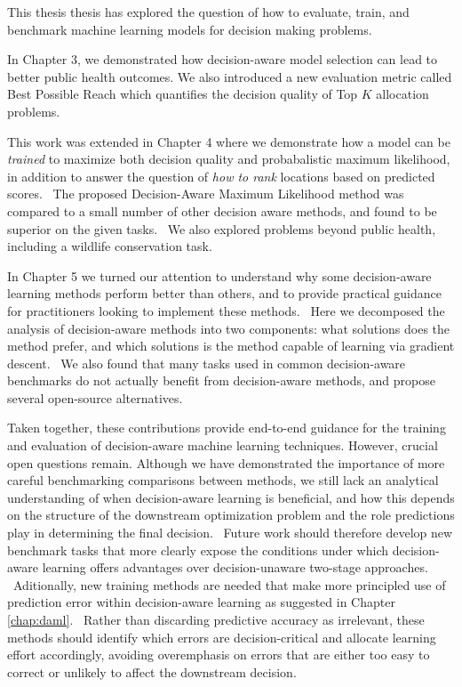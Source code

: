 This thesis thesis has explored the question of how to evaluate, train, and benchmark machine learning models for decision making problems. \

In Chapter 3, we demonstrated how decision-aware model selection can lead to better public health outcomes.
We also introduced a new evaluation metric called Best Possible Reach which quantifies the decision quality of Top $K$ allocation problems.

This work was extended in Chapter 4 where we demonstrate how a model can be \emph{trained} to maximize both decision quality and probabalistic maximum likelihood, in addition to answer the question of \emph{how to rank} locations based on predicted scores. \
The proposed Decision-Aware Maximum Likelihood method was compared to a small number of other decision aware methods, and found to be superior on the given tasks. \
We also explored problems beyond public health, including a wildlife conservation task.

In Chapter 5 we turned our attention to understand why some decision-aware learning methods perform better than others, and to provide practical guidance for practitioners looking to implement these methods. \
Here we decomposed the analysis of decision-aware methods into two components: what solutions does the method prefer, and which solutions is the method capable of learning via gradient descent. \
We also found that many tasks used in common decision-aware benchmarks do not actually benefit from decision-aware methods, and propose several open-source alternatives. 

Taken together, these contributions provide end-to-end guidance for the training and evaluation of decision-aware machine learning techniques.
However, crucial open questions remain. Although we have demonstrated the importance of more careful benchmarking comparisons between methods, we still lack an analytical understanding of when decision-aware learning is beneficial, and how this depends on the structure of the downstream optimization problem and the role predictions play in determining the final decision. \
Future work should therefore develop new benchmark tasks that more clearly expose the conditions under which decision-aware learning offers advantages over decision-unaware two-stage approaches. \
Aditionally, new training methods are needed that make more principled use of prediction error within decision-aware learning as suggested in Chapter \ref{chap:daml}. \
Rather than discarding predictive accuracy as irrelevant, these methods should identify which errors are decision-critical and allocate learning effort accordingly, avoiding overemphasis on errors that are either too easy to correct or unlikely to affect the downstream decision. \

